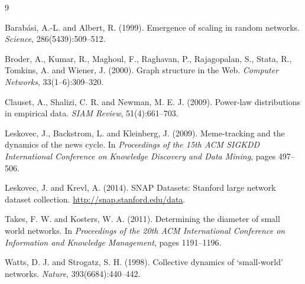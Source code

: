 \documentclass[sigconf]{webmedia}
\begin{document}
\begin{thebibliography}{9}

Barabási, A.-L. and Albert, R. (1999).
\newblock Emergence of scaling in random networks.
\newblock \textit{Science}, 286(5439):509--512.

Broder, A., Kumar, R., Maghoul, F., Raghavan, P., Rajagopalan, S., Stata, R.,
Tomkins, A. and Wiener, J. (2000).
\newblock Graph structure in the Web.
\newblock \textit{Computer Networks}, 33(1--6):309--320.

Clauset, A., Shalizi, C. R. and Newman, M. E. J. (2009).
\newblock Power-law distributions in empirical data.
\newblock \textit{SIAM Review}, 51(4):661--703.

Leskovec, J., Backstrom, L. and Kleinberg, J. (2009).
\newblock Meme-tracking and the dynamics of the news cycle.
\newblock In \textit{Proceedings of the 15th ACM SIGKDD International
Conference on Knowledge Discovery and Data Mining}, pages 497--506.

Leskovec, J. and Krevl, A. (2014).
\newblock SNAP Datasets: Stanford large network dataset collection.
\newblock \url{http://snap.stanford.edu/data}.

Takes, F. W. and Kosters, W. A. (2011).
\newblock Determining the diameter of small world networks.
\newblock In \textit{Proceedings of the 20th ACM International Conference
on Information and Knowledge Management}, pages 1191--1196.

Watts, D. J. and Strogatz, S. H. (1998).
\newblock Collective dynamics of `small-world' networks.
\newblock \textit{Nature}, 393(6684):440--442.

\end{thebibliography}
\end{document}
